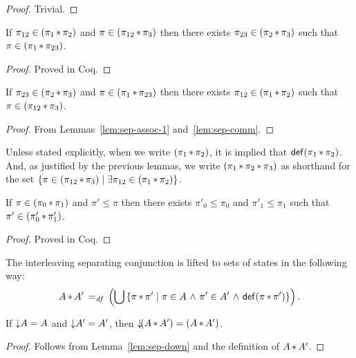 \documentclass[11pt]{report}
\begin{document}
\begin{proof}
	Trivial. 
\end{proof}

\begin{lemma}[Associativity-1]
	\label{lem:sep-assoc-1}
	If $\pi_{12} \in (\pi_1 \operatorname{\ast} \pi_2)$ and $\pi \in (\pi_{12} \operatorname{\ast} \pi_3)$ then there exists $\pi_{23} \in (\pi_2 \operatorname{\ast} \pi_3)$ such that $\pi \in (\pi_1 \operatorname{\ast} \pi_{23})$. 
\end{lemma}

\begin{proof}
	Proved in Coq.
\end{proof}

\begin{lemma}
	\label{lem:sep-assoc-2}
	If $\pi_{23} \in (\pi_2 \operatorname{\ast} \pi_3)$ and $\pi \in (\pi_1 \operatorname{\ast} \pi_{23})$ then there exists $\pi_{12} \in (\pi_1 \operatorname{\ast} \pi_2)$ such that $\pi \in (\pi_{12} \operatorname{\ast} \pi_3)$. 
\end{lemma}

\begin{proof}
	From Lemmas~\ref{lem:sep-assoc-1} and~\ref{lem:sep-comm}. 
\end{proof}

Unless stated explicitly, when we write $(\pi_1 \operatorname{\ast} \pi_2)$, it is implied that $\mathsf{def}(\pi_1 \operatorname{\ast} \pi_2)$. And, as justified by the previous lemmas, we write $(\pi_1 \operatorname{\ast} \pi_2 \operatorname{\ast} \pi_3)$ as shorthand for the set $\left\lbrace \pi \in (\pi_{12} \operatorname{\ast} \pi_3) \mid \exists \pi_{12} \in (\pi_1 \operatorname{\ast} \pi_2) \right\rbrace$. 

\begin{lemma}
	\label{lem:sep-down}
	If $\pi \in (\pi_0 \operatorname{\ast} \pi_1)$ and $\pi' \leq \pi$ then there exists $\pi'_0 \leq \pi_0$ and $\pi'_1 \leq \pi_1$ such that $\pi' \in (\pi'_0 \operatorname{\ast} \pi'_1)$. 
\end{lemma}

\begin{proof}
	Proved in Coq. 
\end{proof}

The interleaving separating conjunction is lifted to sets of states in the following way: \[ A \operatorname{\ast} A' \operatorname{\;=_{\mathit{df}}\;} \left(\bigcup \left\lbrace \pi \operatorname{\ast} \pi' \mid \pi \in A \operatorname{\,\wedge\,} \pi' \in A' \operatorname{\,\wedge\,} \mathsf{def}(\pi \operatorname{\ast} \pi') \right\rbrace\right).\] 

\begin{lemma}
	\label{lem:sep-closure}
	If $\operatorname{\downarrow}\!A = A$ and $\operatorname{\downarrow}\!A' = A'$, then $\operatorname{\downarrow}\!(A \operatorname{\ast} A') = (A \operatorname{\ast} A')$. 
\end{lemma}

\begin{proof}
	Follows from Lemma~\ref{lem:sep-down} and the definition of $A \operatorname{\ast} A'$. 
\end{proof}
\end{document}
